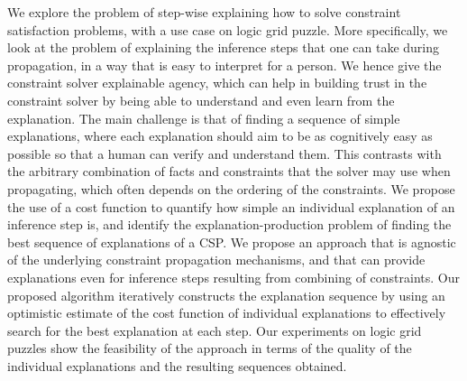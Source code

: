 We explore the problem of step-wise explaining how to solve constraint satisfaction problems, with a use case on logic grid puzzle. More specifically, we look at the problem of explaining the inference steps that one can take during propagation, in a way that is easy to interpret for a person. We hence give the constraint solver explainable agency, which can help in building trust in the constraint solver by being able to understand and even learn from the explanation.
The main challenge is that of finding a sequence of simple explanations, where each explanation should aim to be as cognitively easy as possible so that a human can verify and understand them. This contrasts with the arbitrary combination of facts and constraints that the solver may use when propagating, which often depends on the ordering of the constraints.
We propose the use of a cost function to quantify how simple an individual explanation of an inference step is, and identify the explanation-production problem of finding the best sequence of explanations of a CSP. 
We propose an approach that is agnostic of the underlying constraint propagation mechanisms, and that can provide explanations even for inference steps resulting from combining of constraints.
Our proposed algorithm iteratively constructs the explanation sequence by using an optimistic estimate of the cost function of individual explanations to effectively search for the best explanation at each step.
Our experiments on logic grid puzzles show the feasibility of the approach in terms of the quality of the individual explanations and the resulting sequences obtained.